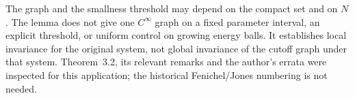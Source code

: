 The graph and the smallness threshold may depend on the compact set and on
$N$. The lemma does not give one $C^\infty$ graph on a fixed parameter
interval, an explicit threshold, or uniform control on growing energy
balls. It establishes local invariance for the original system, not global
invariance of the cutoff graph under that system. Theorem~3.2, its relevant
remarks and the author's errata were inspected for this application; the
historical Fenichel/Jones numbering is not needed.
